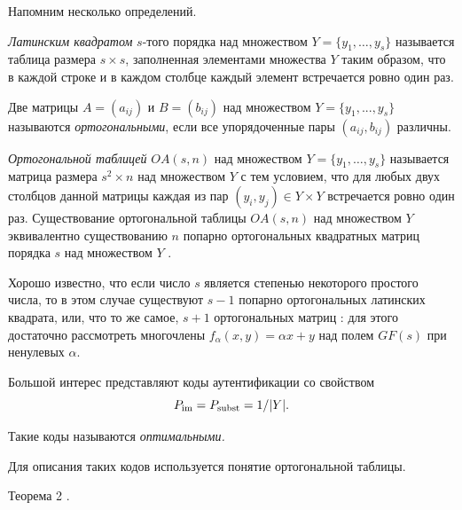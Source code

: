 \vskip 0.1in





Напомним несколько определений.

{\it Латинским квадратом} $s$-того порядка над множеством $Y = \{y_1,\dots, y_s\}$ называется таблица размера $s\times s$, заполненная элементами множества $Y$ таким образом, что в каждой строке и в каждом столбце каждый элемент встречается ровно один раз.



Две матрицы $A=(a_{ij})$ и $B=(b_{ij})$ над множеством $Y = \{y_1,...,y_s\}$ называются {\it ортогональными}, если все упорядоченные пары $(a_{ij}, b_{ij})$ различны.



{\it Ортогональной таблицей} $OA(s,n)$ над множеством $Y = \{y_1,\dots ,y_s\}$ называется матрица размера $s^2 \times n$ над множеством $Y$ с тем условием, что для любых двух столбцов данной матрицы каждая из пар $(y_i,y_j) \in Y\times Y$ встречается ровно один раз. Существование ортогональной таблицы $OA(s,n)$ над множеством $Y$ эквивалентно существованию $n$ попарно ортогональных квадратных матриц порядка $s$ над множеством $Y$ \cite{ratseev:bib:Holl}.



Хорошо известно, что если число $s$ является степенью некоторого простого числа, то в этом случае существуют $s-1$ попарно ортогональных латинских квадрата, или, что то же самое, $s+1$ ортогональных матриц \cite{ratseev:bib:Bose}: для этого достаточно рассмотреть многочлены $f_{\alpha}(x,y)=\alpha x+y$ над полем $GF(s)$ при ненулевых $\alpha$.



Большой интерес представляют коды аутентификации со свойством $$P_{\rm im} = P_{\rm subst}={1}/{|Y|}.$$ 

Такие коды называются {\it оптимальными.} 

Для описания таких кодов используется понятие ортогональной таблицы.







\vskip 0.1in



{\small\sc Теорема 2 \cite{ratseev:bib:Cheremushkin}.}

